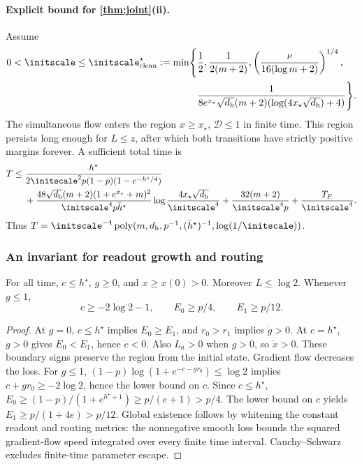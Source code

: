 \paragraph{Explicit bound for \cref{thm:joint}(ii).}
Assume
\begin{equation}
 \begin{aligned}
 0<\initscale\le\initscale^\star_{\mathrm{clean}}:=\min\Biggl\{&\frac12,\frac1{2(m+2)},
 \left(\frac{\nu}{16(\log m+2)}\right)^{1/4},\\
 &\frac1{8e^{x_\star}\sqrt{d_{\mathrm h}}(m+2)(\log(4x_\star\sqrt{d_{\mathrm h}})+4)}\Biggr\}.
 \end{aligned}
 \label{eq:CR-scale}
\end{equation}
The simultaneous flow enters the region $x\ge x_\star$, $\mathcal D\le1$ in finite time. This region persists long enough for $L\le z$, after which both transitions have strictly positive margins forever. A sufficient total time is
\begin{align}
 T\le{}&\frac{h^\star}{2\initscale^2 p(1-p)(1-e^{-h^\star/4})}\notag\\
 &+\frac{48\sqrt{d_{\mathrm h}}(m+2)(1+e^{x_\star}+m)^2}{\initscale^4p\bar h^\star}
       \log\frac{4x_\star\sqrt{d_{\mathrm h}}}{\initscale^4}
 +\frac{32(m+2)}{\initscale^4p}+\frac{T_F}{\initscale^4}.\label{eq:CR-time}
\end{align}
Thus $T=\initscale^{-4}\operatorname{poly}(m,d_{\mathrm h},p^{-1},(\bar h^\star)^{-1},\log(1/\initscale))$.

\subsubsection{An invariant for readout growth and routing}
\begin{lemma}
\label{lem:CR-align}
For all time, $c\le h^\star$, $g\ge0$, and $x\ge x(0)>0$. Moreover $L\le\log2$. Whenever $g\le1$,
\[
 c\ge-2\log2-1,\qquad E_0\ge p/4,\qquad E_1\ge p/12.
\]
\end{lemma}
\begin{proof}
At $g=0$, $c\le h^\star$ implies $E_0\ge E_1$, and $r_0>r_1$ implies $\dot g>0$.
At $c=h^\star$, $g>0$ gives $E_0<E_1$, hence $\dot c<0$. Also $L_a>0$ when $g>0$, so $\dot x>0$.
These boundary signs preserve the region from the initial state. Gradient flow decreases the loss.
For $g\le1$, $(1-p)\log(1+e^{-c-gr_0})\le\log2$ implies $c+gr_0\ge-2\log2$, hence the lower bound on $c$.
Since $c\le h^\star$,
$E_0\ge(1-p)/(1+e^{h^\star+1})\ge p/(e+1)>p/4$.
The lower bound on $c$ yields $E_1\ge p/(1+4e)>p/12$.
Global existence follows by whitening the constant readout and routing metrics: the nonnegative smooth loss bounds the squared gradient-flow speed integrated over every finite time interval. Cauchy--Schwarz excludes finite-time parameter escape.
\end{proof}

